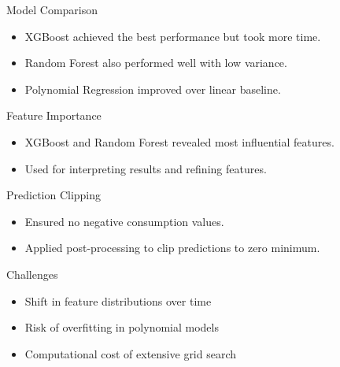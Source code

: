 \documentclass{beamer}
\begin{document}
\begin{frame}{Model Comparison}
  \begin{itemize}
    \item XGBoost achieved the best performance but took more time.
    \item Random Forest also performed well with low variance.
    \item Polynomial Regression improved over linear baseline.
  \end{itemize}
\end{frame}

\begin{frame}{Feature Importance}
  \begin{itemize}
    \item XGBoost and Random Forest revealed most influential features.
    \item Used for interpreting results and refining features.
  \end{itemize}
\end{frame}

\begin{frame}{Prediction Clipping}
  \begin{itemize}
    \item Ensured no negative consumption values.
    \item Applied post-processing to clip predictions to zero minimum.
  \end{itemize}
\end{frame}


\begin{frame}{Challenges}
  \begin{itemize}
    \item Shift in feature distributions over time
    \item Risk of overfitting in polynomial models
    \item Computational cost of extensive grid search
  \end{itemize}
\end{frame}

\end{document}

